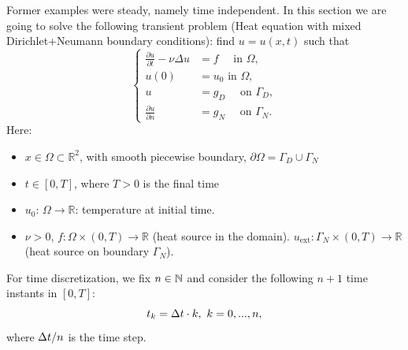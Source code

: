 \documentclass[12pt]{article}
\newcommand{\R}{{\mathbb R}}
\begin{document}
Former examples were steady, namely time independent. In this section we are going
to solve the following transient problem (Heat equation with mixed
Dirichlet+Neumann boundary conditions): find $u=u(x,t)$ such that
\begin{equation}
  \label{eq:heat equation}
  \left\{
    \begin{aligned}
      \frac{\partial u}{\partial t} -\nu\Delta u &= f \quad \text{ in } \Omega, \\
      u(0)&=u_0 \text{ in } \Omega, \\
      u &= g_D \quad \text{ on } \Gamma_D, \\
      \frac{\partial u}{\partial n} &= g_N \quad \text{ on } \Gamma_N.
    \end{aligned}
    \right.
\end{equation}
Here:
\begin{itemize}
\item $x\in\Omega\subset\R^2$, with smooth piecewise boundary,  $\partial\Omega=\Gamma_D\cup\Gamma_N$
\item $t\in [0,T]$, where $T>0$ is the final time
\item $u_0$: $\Omega\to\R$: temperature at initial time.
\item $\nu>0$, $f:\Omega\times(0,T)\to\R$ (heat source in the domain).
  $u_{\text{ext}}:\Gamma_N\times(0,T)\to\R$ (heat source on boundary $\Gamma_N$).
\end{itemize}

For time discretization, we fix $n\in{\mathbb N}$ and consider the
following $n+1$ time instants in $[0,T]$:
$$t_k= \Delta t\cdot k, \ k=0, ..., n,$$
where $\Delta t/n$ is the time step.
\end{document}
